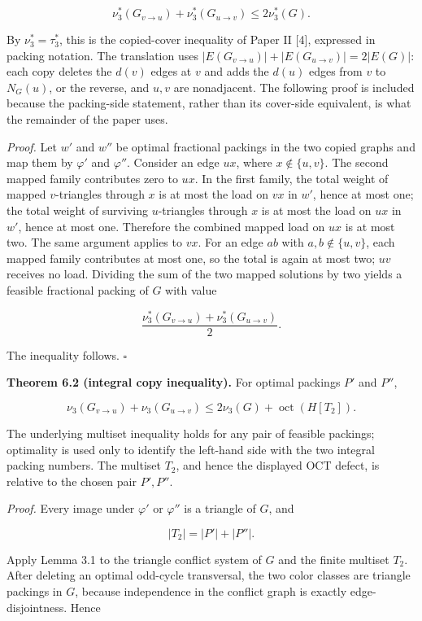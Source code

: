\documentclass[english,11pt,a4paper]{article}
\begin{document}
\[
\nu_3^*(G_{v\to u})+\nu_3^*(G_{u\to v})
\le
2\nu_3^*(G).
\]

By \(\nu_3^*=\tau_3^*\), this is the copied-cover inequality of Paper II
{[}4{]}, expressed in packing notation. The translation uses
\(|E(G_{v\to u})|+|E(G_{u\to v})|=2|E(G)|\): each copy deletes the
\(d(v)\) edges at \(v\) and adds the \(d(u)\) edges from \(v\) to
\(N_G(u)\), or the reverse, and \(u,v\) are nonadjacent. The following
proof is included because the packing-side statement, rather than its
cover-side equivalent, is what the remainder of the paper uses.

\emph{Proof.} Let \(w'\) and \(w''\) be optimal fractional packings in
the two copied graphs and map them by \(\varphi'\) and \(\varphi''\).
Consider an edge \(ux\), where \(x\notin\{u,v\}\). The second mapped
family contributes zero to \(ux\). In the first family, the total weight
of mapped \(v\)-triangles through \(x\) is at most the load on \(vx\) in
\(w'\), hence at most one; the total weight of surviving \(u\)-triangles
through \(x\) is at most the load on \(ux\) in \(w'\), hence at most
one. Therefore the combined mapped load on \(ux\) is at most two. The
same argument applies to \(vx\). For an edge \(ab\) with
\(a,b\notin\{u,v\}\), each mapped family contributes at most one, so the
total is again at most two; \(uv\) receives no load. Dividing the sum of
the two mapped solutions by two yields a feasible fractional packing of
\(G\) with value

\[
\frac{\nu_3^*(G_{v\to u})+\nu_3^*(G_{u\to v})}{2}.
\]

The inequality follows. \(\square\)

\textbf{Theorem 6.2 (integral copy inequality).} For optimal packings
\(P'\) and \(P''\),

\[
\nu_3(G_{v\to u})+\nu_3(G_{u\to v})
\le
2\nu_3(G)+\operatorname{oct}(H[T_2]).
\]

The underlying multiset inequality holds for any pair of feasible
packings; optimality is used only to identify the left-hand side with
the two integral packing numbers. The multiset \(T_2\), and hence the
displayed OCT defect, is relative to the chosen pair \(P',P''\).

\emph{Proof.} Every image under \(\varphi'\) or \(\varphi''\) is a
triangle of \(G\), and

\[
|T_2|=|P'|+|P''|.
\]

Apply Lemma 3.1 to the triangle conflict system of \(G\) and the finite
multiset \(T_2\). After deleting an optimal odd-cycle transversal, the
two color classes are triangle packings in \(G\), because independence
in the conflict graph is exactly edge-disjointness. Hence
\end{document}

